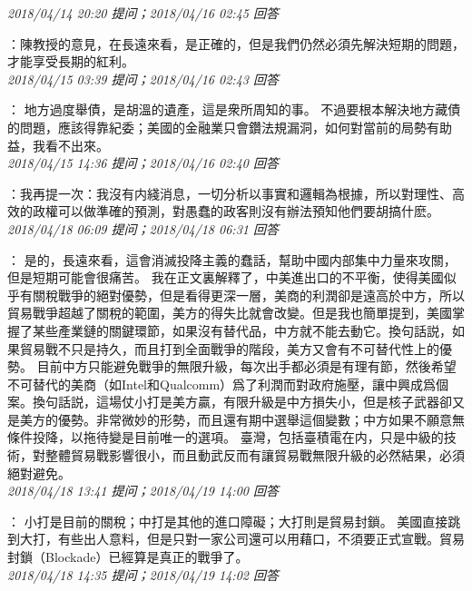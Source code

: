 \documentclass[twocolumn]{ctexart}
\begin{document}
\textit{\hfill\noindent\small 2018/04/14 20:20 提问；2018/04/16 02:45 回答}

：陳教授的意見，在長遠來看，是正確的，但是我們仍然必須先解決短期的問題，才能享受長期的紅利。
\\

\textit{\hfill\noindent\small 2018/04/15 03:39 提问；2018/04/16 02:43 回答}

：
地方過度舉債，是胡溫的遺產，這是衆所周知的事。
不過要根本解決地方藏債的問題，應該得靠紀委；美國的金融業只會鑽法規漏洞，如何對當前的局勢有助益，我看不出來。
\\

\textit{\hfill\noindent\small 2018/04/15 14:36 提问；2018/04/16 02:40 回答}

：我再提一次：我沒有内綫消息，一切分析以事實和邏輯為根據，所以對理性、高效的政權可以做準確的預測，對愚蠢的政客則沒有辦法預知他們要胡搞什麽。
\\

\textit{\hfill\noindent\small 2018/04/18 06:09 提问；2018/04/18 06:31 回答}

：
是的，長遠來看，這會消滅投降主義的蠢話，幫助中國内部集中力量來攻關，但是短期可能會很痛苦。 
我在正文裏解釋了，中美進出口的不平衡，使得美國似乎有關稅戰爭的絕對優勢，但是看得更深一層，美商的利潤卻是遠高於中方，所以貿易戰爭超越了關稅的範圍，美方的得失比就會改變。但是我也簡單提到，美國掌握了某些產業鏈的關鍵環節，如果沒有替代品，中方就不能去動它。換句話説，如果貿易戰不只是持久，而且打到全面戰爭的階段，美方又會有不可替代性上的優勢。 
目前中方只能避免戰爭的無限升級，每次出手都必須是有理有節，然後希望不可替代的美商（如Intel和Qualcomm）爲了利潤而對政府施壓，讓中興成爲個案。換句話説，這場仗小打是美方贏，有限升級是中方損失小，但是核子武器卻又是美方的優勢。非常微妙的形勢，而且還有期中選舉這個變數；中方如果不願意無條件投降，以拖待變是目前唯一的選項。 
臺灣，包括臺積電在内，只是中級的技術，對整體貿易戰影響很小，而且動武反而有讓貿易戰無限升級的必然結果，必須絕對避免。
\\

\textit{\hfill\noindent\small 2018/04/18 13:41 提问；2018/04/19 14:00 回答}

：
小打是目前的關稅；中打是其他的進口障礙；大打則是貿易封鎖。
美國直接跳到大打，有些出人意料，但是只對一家公司還可以用藉口，不須要正式宣戰。貿易封鎖（Blockade）已經算是真正的戰爭了。
\\

\textit{\hfill\noindent\small 2018/04/18 14:35 提问；2018/04/19 14:02 回答}
\end{document}
